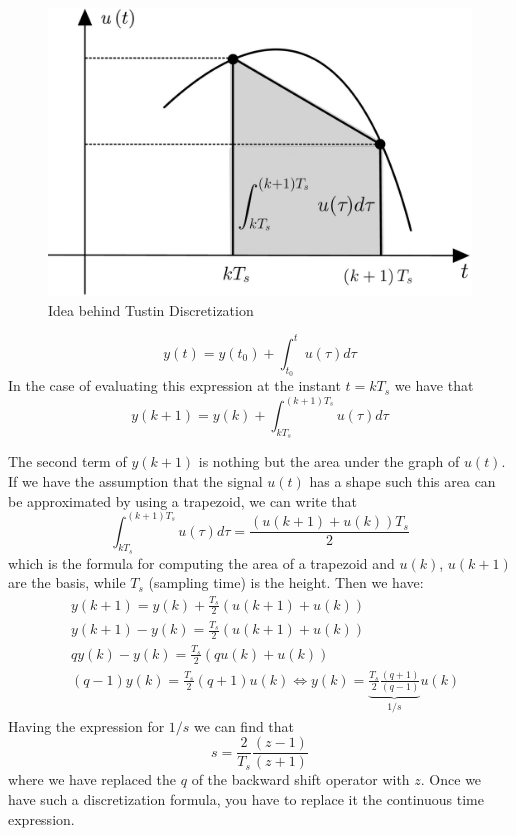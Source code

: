 \begin{multicols}{2}
    \begin{figure}[H]
        \centering
        \includegraphics[scale=0.13]{img/Tustin_2.jpg}
        \caption{Idea behind Tustin Discretization}
    \end{figure}
    \begin{equation*}
        y(t)=y(t_0)+\int_{t_0}^t u(\tau){d\tau}
    \end{equation*}
    In the case of evaluating this expression at the instant $t=kT_s$ we have that 
    \begin{equation}
        y(k+1)=y(k)+\int_{kT_s}^{(k+1)T_s} u(\tau){d\tau}
    \end{equation}
\end{multicols}

\noindent
The second term of $y(k+1)$ is nothing but the area under the graph of $u(t)$. If we have  the assumption that the signal $u(t)$ has a shape such this area can be approximated by using a trapezoid, we can write that
\begin{equation}
    \int_{kT_s}^{(k+1)T_s} u(\tau){d\tau}=\frac{(u(k+1)+u(k))T_s}{2}
\end{equation}
which is the formula for computing the area of a trapezoid and $u(k)$, $u(k+1)$ are the basis, while $T_s$ (sampling time) is the height. Then we have:
\begin{align}
    &y(k+1)=y(k)+\frac{T_s}{2}(u(k+1)+u(k))\\
    &y(k+1)-y(k)=\frac{T_s}{2}(u(k+1)+u(k))\\
    &qy(k)-y(k)=\frac{T_s}{2}(qu(k)+u(k))\\
    &(q-1)y(k)=\frac{T_s}{2}(q+1)u(k) \iff 
    y(k)=\underbrace{\frac{T_s}{2}\frac{(q+1)}{(q-1)}}_{1/s}u(k)
\end{align}
Having the expression for  $1/s$ we can find that
\begin{equation}\label{eq:tustin_discret}
    s=\frac{2}{T_s}\frac{(z-1)}{(z+1)}
\end{equation}
where we have replaced the $q$ of the backward shift operator with $z$. Once we have such a discretization formula, you have to replace it the continuous time expression.

